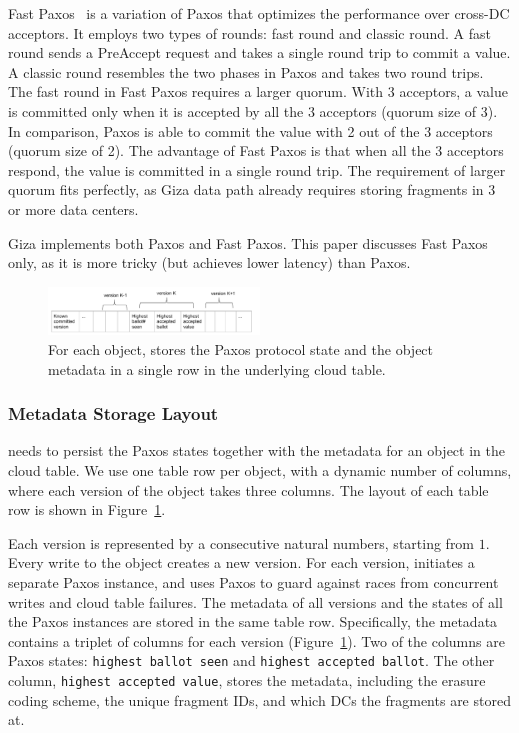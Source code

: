 Fast Paxos~\cite{lamport05fast} is a variation of Paxos that optimizes the
performance over cross-DC acceptors. It employs two types of rounds: fast round
and classic round. A fast round sends a PreAccept request and takes a single
round trip to commit a value. A classic round resembles the two phases in Paxos
and takes two round trips. The fast round in Fast Paxos requires a larger quorum.
With $3$ acceptors,
a value is committed only when it is accepted by all the 3 acceptors (quorum size of 3).
In comparison, Paxos is able to commit the value with 2 out of the 3 acceptors (quorum size of 2).
The advantage of Fast Paxos is that when all the 3 acceptors respond, the value is committed
in a single round trip. The requirement of larger quorum fits \name perfectly,
as Giza data path already requires storing fragments in 3 or more data centers.

Giza implements both Paxos and Fast Paxos. This paper discusses Fast Paxos only, as
it is more tricky (but achieves lower latency) than Paxos.

\begin{figure}[tp]
\centering
\includegraphics[width=0.5\textwidth]{fig/Giza_Metadata}
\caption{For each object, \name stores the Paxos protocol state and the object metadata 
in a single row in the underlying cloud table.\label{fig:metadataschema}}
\end{figure}

\subsubsection{Metadata Storage Layout}

\name needs to persist the Paxos states together with the metadata for an object in the cloud table. 
We use one table row per object, with a dynamic number of columns,
where each version of the object takes three columns. The layout of each table row is
shown in Figure~\ref{fig:metadataschema}.

Each version is represented by a consecutive natural numbers, starting
from $1$. Every \name write to the object creates a new version. For each
version, \name initiates a separate Paxos instance, and uses Paxos to guard
against races from concurrent writes and cloud table failures.
The metadata of all versions and the states of all the Paxos instances
are stored in the same table row. Specifically, the metadata contains a triplet
of columns for each version (Figure~\ref{fig:metadataschema}). Two
of the columns are Paxos states: {\tt highest ballot seen} and {\tt highest accepted
  ballot}. The other column, {\tt highest accepted value}, stores the metadata,
including the erasure coding scheme, the unique fragment IDs,
and which DCs the fragments are stored at.

